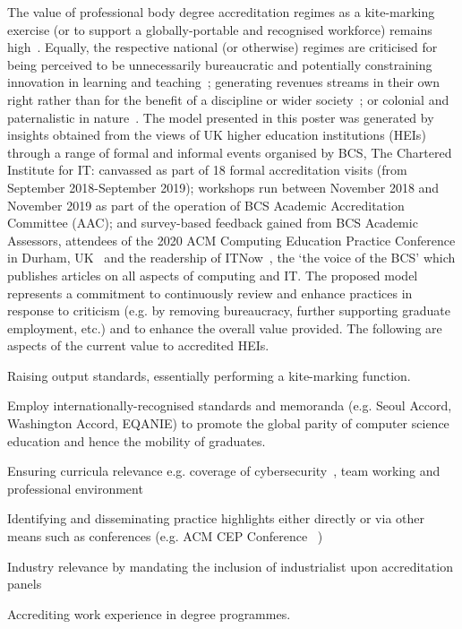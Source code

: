 \documentclass[sigconf]{acmart}
\begin{document}
The value of professional body degree accreditation regimes as a
kite-marking exercise (or to support a globally-portable and
recognised workforce) remains high~\cite{Knight_2015}. Equally, the
respective national (or otherwise) regimes are criticised for being
perceived to be unnecessarily bureaucratic and potentially
constraining innovation in learning and teaching~\cite{Harvey2004};
generating revenues streams in their own right rather than for the
benefit of a discipline or wider society~\cite{Knight_2015}; or
colonial and paternalistic in nature~\cite{Mutereko2017}.  The model
presented in this poster was generated by insights obtained from the
views of UK higher education institutions (HEIs) through a range of
formal and informal events organised by BCS, The Chartered Institute
for IT: canvassed as part of 18 formal accreditation visits (from
September 2018-September 2019); workshops run between November 2018
and November 2019 as part of the operation of BCS Academic
Accreditation Committee (AAC); and survey-based feedback gained from
BCS Academic Assessors, attendees of the 2020 ACM Computing Education
Practice Conference in Durham, UK~\cite{CrickEtAl2020Cep} and the
readership of ITNow~\cite{CrickEtAl2020ITNow}, the `the voice of the
BCS' which publishes articles on all aspects of computing and IT.  The
proposed model represents a commitment to continuously review and
enhance practices in response to criticism (e.g. by removing
bureaucracy, further supporting graduate employment, etc.) and to
enhance the overall value provided. The following are aspects of the
current value to accredited HEIs.
\begin{compactitem}
	\item {Raising output standards, essentially performing a
kite-marking function.}
	\item {Employ internationally-recognised standards and
memoranda (e.g. Seoul Accord, Washington Accord, EQANIE) to
promote the global parity of computer science education and hence the
mobility of graduates.}
	\item {Ensuring curricula relevance e.g. coverage of
cybersecurity~\cite{Cricketal2019}, team working and professional
environment}
	\item {Identifying and disseminating practice highlights
either directly \cite{practice_highlights_2020} or via other means
such as conferences (e.g. ACM CEP Conference~\cite{CrickEtAl2020Cep}} )
	\item {Industry relevance by mandating the inclusion of
industrialist upon accreditation panels}
	\item {Accrediting work experience in degree programmes.}
        \end{compactitem}
\end{document}
